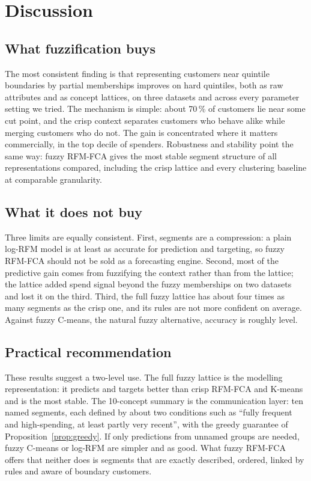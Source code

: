 \section{Discussion}\label{sec:discussion}

\subsection{What fuzzification buys}

The most consistent finding is that representing customers near quintile boundaries by partial memberships improves on hard quintiles, both as raw attributes and as concept lattices, on three datasets and across every parameter setting we tried. The mechanism is simple: about 70\,\% of customers lie near some cut point, and the crisp context separates customers who behave alike while merging customers who do not. The gain is concentrated where it matters commercially, in the top decile of spenders. Robustness and stability point the same way: fuzzy RFM-FCA gives the most stable segment structure of all representations compared, including the crisp lattice and every clustering baseline at comparable granularity.

\subsection{What it does not buy}

Three limits are equally consistent. First, segments are a compression: a plain log-RFM model is at least as accurate for prediction and targeting, so fuzzy RFM-FCA should not be sold as a forecasting engine. Second, most of the predictive gain comes from fuzzifying the context rather than from the lattice; the lattice added spend signal beyond the fuzzy memberships on two datasets and lost it on the third. Third, the full fuzzy lattice has about four times as many segments as the crisp one, and its rules are not more confident on average. Against fuzzy C-means, the natural fuzzy alternative, accuracy is roughly level.

\subsection{Practical recommendation}

These results suggest a two-level use. The full fuzzy lattice is the modelling representation: it predicts and targets better than crisp RFM-FCA and K-means and is the most stable. The 10-concept summary is the communication layer: ten named segments, each defined by about two conditions such as ``fully frequent and high-spending, at least partly very recent'', with the greedy guarantee of Proposition~\ref{prop:greedy}. If only predictions from unnamed groups are needed, fuzzy C-means or log-RFM are simpler and as good. What fuzzy RFM-FCA offers that neither does is segments that are exactly described, ordered, linked by rules and aware of boundary customers.


